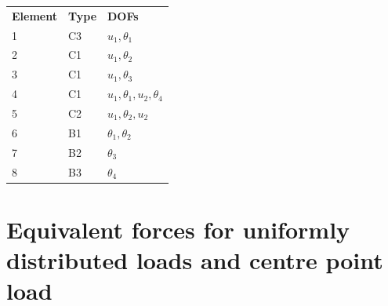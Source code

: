\begin{example}
\leavevmode

\begin{minipage}{0.55\linewidth}\centering\end{minipage}\hfill
\begin{minipage}{0.42\linewidth}
  \begin{tabular}{lll}
    \textbf{Element} & \textbf{Type} & \textbf{DOFs}\\
    1 & C3 & $u_1, \theta_1$\\
    2 & C1 & $u_1, \theta_2$\\
    3 & C1 & $u_1, \theta_3$\\
    4 & C1 & $u_1, \theta_1, u_2, \theta_4$\\
    5 & C2 & $u_1, \theta_2, u_2$\\
    6 & B1 & $\theta_1, \theta_2$\\
    7 & B2 & $\theta_3$\\
    8 & B3 & $\theta_4$
  \end{tabular}
\end{minipage}
\end{example}

\section{Equivalent forces for uniformly distributed loads and centre point load}
\begin{figure}[H]
  \centering
  
\end{figure}

